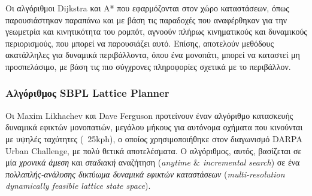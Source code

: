 %

\bigskip
Οι αλγόριθμοι Dijkstra και A* που εφαρμόζονται στον χώρο καταστάσεων, όπως παρουσιάστηκαν παραπάνω και με βάση τις παραδοχές που αναφέρθηκαν για την γεωμετρία και κινητικότητα του ρομπότ, αγνοούν πλήρως κινηματικούς και δυναμικούς περιορισμούς, που μπορεί να παρουσιάζει αυτό. Επίσης, αποτελούν μεθόδους ακατάλληλες για δυναμικά περιβάλλοντα, όπου ένα μονοπάτι, μπορεί να καταστεί μη προσπελάσιμο, με βάση τις πιο σύγχρονες πληροφορίες σχετικά με το περιβάλλον.



\subsubsection{Αλγόριθμος SBPL Lattice Planner} \label{sssec:sbpl}
Οι Maxim Likhachev και Dave Ferguson \cite{sbpl} προτείνουν έναν αλγόριθμο κατασκευής δυναμικά εφικτών μονοπατιών, μεγάλου μήκους για αυτόνομα οχήματα που κινούνται με υψηλές ταχύτητες (~25kph), ο οποίος χρησιμοποιήθηκε στον διαγωνισμό DARPA Urban Challenge, με πολύ θετικά αποτελέσματα. Ο αλγόριθμος, αυτός, βασίζεται σε μία \textit{χρονικά άμεση} και \textit{σταδιακή} αναζήτηση (\textit{anytime $\&$ incremental search}) σε ένα \textit{πολλαπλής-ανάλυσης δικτύωμα δυναμικά εφικτών καταστάσεων} (\textit{multi-resolution dynamically feasible lattice state space}).

